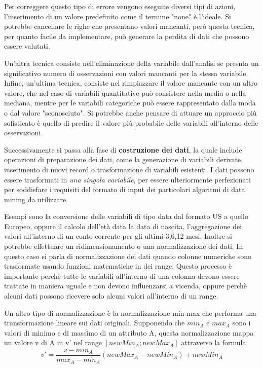 \documentclass[a4paper]{extarticle}
\begin{document}
Per correggere questo tipo di errore vengono eseguite diversi tipi di azioni, l'inserimento di un valore predefinito come il termine "none" è l'ideale. Si potrebbe cancellare le righe che presentano valori mancanti, però questa tecnica, per quanto facile da implementare, può generare la perdita di dati che possono essere valutati. 

Un'altra tecnica consiste nell'eliminazione della variabile dall'analisi se presnta un significativo numero di osservazioni con valori mancanti per la stessa variabile. Infine, un'ultima tecnica, consiste nel rimpiazzare il valore mancante con un altro valore, che nel caso di variabili quantitative può consistere nella media o nella mediana, mentre per le variabili categoriche può essere rappresentato dalla moda o dal valore "sconosciuto". Si potrebbe anche pensare di attuare un approccio più sofisticato è quello di predire il valore più probabile delle variabili all'interno delle osservazioni.

Successivamente si passa alla fase di \textbf{costruzione dei dati}, la quale include operazioni di preparazione dei dati, come la generazione di variabili derivate, inserimento di nuovi record o trasformazione di variabili esistenti. I dati possono essere trasformati in \textit{una singola variabile}, per essere ulteriormente perfezionati per soddisfare i requisiti del formato di input dei particolari algoritmi di data mining da utilizzare.

Esempi sono la conversione delle variabili di tipo data dal formato US a quello Europeo, oppure il calcolo dell'età data la data di nascita, l'aggregazione dei valori all'interno di un conto corrente per gli ultimi 3,6,12 mesi. Inoltre si potrebbe effettuare un ridimensionamento o una normalizzazione dei dati. In questo caso si parla di normalizzazione dei dati quando colonne numeriche sono trasformate usando funzioni matematiche in dei range. Questo processo è importante perchè tutte le variabili all'interno di una colonna devono essere trattate in maniera uguale e non devono influenzarsi a vicenda, oppure perchè alcuni dati possono ricevere solo alcuni valori all'interno di un range.

Un altro tipo di normalizzazione è la normalizzazione min-max che performa una transformazione lineare sui dati originali. Supponendo che $ min_A$ e $max_A$ sono i valori di minimo e di massimo di un attributo A, questa normalizzazione mappa un valore v di A in v' nel range $[newMin_A; newMax_A]$ attraverso la formula:
\begin{equation}
v'= \frac{v-min_A}{max_A-min_A}(newMax_A - newMin_A)+newMin_A
\end{equation}
\end{document}
